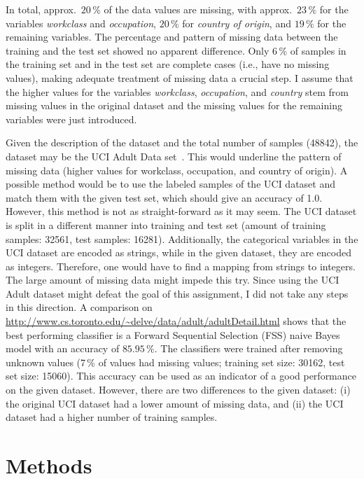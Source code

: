 \documentclass[a4paper]{article}
\begin{document}
In total, approx.\ $20\,\%$ of the data values are missing, with
approx.\ $23\,\%$ for the variables \emph{workclass} and
\emph{occupation}, $20\,\%$ for \emph{country of origin}, and $19\,\%$
for the remaining variables. The percentage and pattern of missing
data between the training and the test set showed no apparent
difference. Only $6\,\%$ of samples in the training set and in the
test set are complete cases (i.e., have no missing values), making
adequate treatment of missing data a crucial step. I assume that the
higher values for the variables \emph{workclass}, \emph{occupation},
and \emph{country} stem from missing values in the original dataset
and the missing values for the remaining variables were just
introduced.

Given the description of the dataset and the total number of samples
(48842), the dataset may be the UCI Adult Data
set~\cite{lichman2013}. This would underline the pattern of missing
data (higher values for workclass, occupation, and country of
origin). A possible method would be to use the labeled samples of the
UCI dataset and match them with the given test set, which should give
an accuracy of 1.0. However, this method is not as straight-forward as
it may seem. The UCI dataset is split in a different manner into
training and test set (amount of training samples: 32561, test
samples: 16281). Additionally, the categorical variables in the UCI
dataset are encoded as strings, while in the given dataset, they are
encoded as integers. Therefore, one would have to find a mapping from
strings to integers. The large amount of missing data might impede
this try. Since using the UCI Adult dataset might defeat the goal
of this assignment, I did not take any steps in this direction. A
comparison on
\url{http://www.cs.toronto.edu/~delve/data/adult/adultDetail.html}
shows that the best performing classifier is a Forward Sequential
Selection (FSS) naive Bayes model with an accuracy of $85.95\,\%$. The
classifiers were trained after removing unknown values (7\,\% of
values had missing values; training set size: 30162, test set size:
15060). This accuracy can be used as an indicator of a good
performance on the given dataset. However, there are two differences
to the given dataset: (i) the original UCI dataset had a lower amount
of missing data, and (ii) the UCI dataset had a higher number of
training samples.

\section{Methods}
\label{sec:methods}
\end{document}
